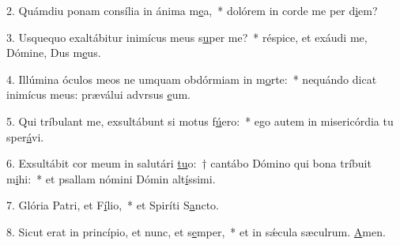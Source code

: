 2. Quámdiu ponam consília in ánima m\uline{e}a,~* dolórem in corde me per d\uline{i}em?\par 
3. Usquequo exaltábitur inimícus meus s\uline{u}per me?~* réspice, et exáudi me, Dómine, Dus m\uline{e}us.\par 
4. Illúmina óculos meos ne umquam obdórmiam in m\uline{o}rte:~* nequándo dicat inimícus meus: præválui advrsus \uline{e}um.\par 
5. Qui tríbulant me, exsultábunt si motus f\uline{ú}ero:~* ego autem in misericórdia tu sper\uline{á}vi.\par 
6. Exsultábit cor meum in salutári \uline{tu}o:~† cantábo Dómino qui bona tríbuit m\uline{i}hi:~* et psallam nómini Dómin alt\uline{í}ssimi.\par 
7. Glória Patri, et F\uline{í}lio,~* et Spiríti S\uline{a}ncto.\par 
8. Sicut erat in princípio, et nunc, et s\uline{e}mper,~* et in sǽcula sæculrum. \uline{A}men.\par 
